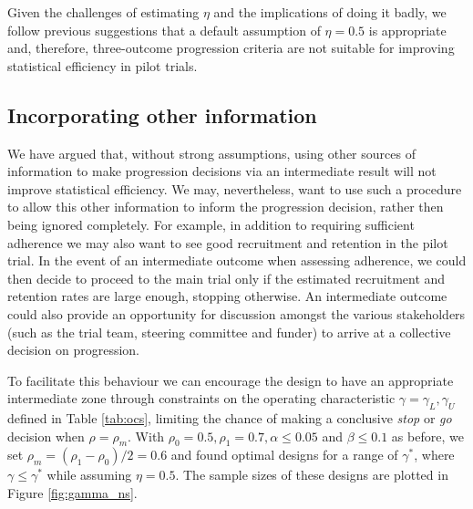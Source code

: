 \documentclass{bmcart}
\begin{document}
Given the challenges of estimating $\eta$ and the implications of doing it badly, we follow previous suggestions \cite{Sargent2001a, Dehbi2020} that a default assumption of $\eta = 0.5$ is appropriate and, therefore, three-outcome progression criteria are not suitable for improving statistical efficiency in pilot trials.


\subsection{Incorporating other information}\label{sec:information}

We have argued that, without strong assumptions, using other sources of information to make progression decisions via an intermediate result will not improve statistical efficiency. We may, nevertheless, want to use such a procedure to allow this other information to inform the progression decision, rather then being ignored completely. For example, in addition to requiring sufficient adherence we may also want to see good recruitment and retention in the pilot trial. In the event of an intermediate outcome when assessing adherence, we could then decide to proceed to the main trial only if the estimated recruitment and retention rates are large enough, stopping otherwise. An intermediate outcome could also provide an opportunity for discussion amongst the various stakeholders (such as the trial team, steering committee and funder) to arrive at a collective decision on progression.

To facilitate this behaviour we can encourage the design to have an appropriate intermediate zone through constraints on the operating characteristic $\gamma = \gamma_L, \gamma_U$ defined in Table \ref{tab:ocs}, limiting the chance of making a conclusive \emph{stop} or \emph{go} decision when $\rho = \rho_m$. With $\rho_0 = 0.5, \rho_1 = 0.7, \alpha \leq 0.05$ and $\beta \leq 0.1$ as before, we set $\rho_m = (\rho_1 - \rho_0)/2 = 0.6$ and found optimal designs for a range of $\gamma^*$, where $\gamma \leq \gamma^*$ while assuming $\eta = 0.5$. The sample sizes of these designs are plotted in Figure \ref{fig:gamma_ns}.
\end{document}
